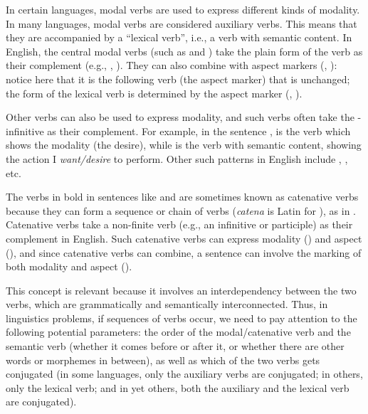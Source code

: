 \begin{refsection}
 In certain languages, modal verbs are used to express different kinds of modality. In many languages, modal verbs are considered auxiliary verbs. This means that they are accompanied by a ``lexical verb'', i.e., a verb with semantic content. In English, the central modal verbs (such as  and ) take the plain form of the verb as their complement (e.g., , ). They can also combine with aspect markers (, ): notice here that it is the following verb (the aspect marker) that is unchanged; the form of the lexical verb is determined by the aspect marker (, ).

 Other verbs can also be used to express modality, and such verbs often take the -infinitive as their complement. For example, in the sentence ,  is the verb which shows the modality (the desire), while  is the verb with semantic content, showing the action I \textit{want/desire} to perform. Other such patterns in English include , , etc.

The verbs in bold in sentences like  and  are sometimes known as catenative verbs because they can form a sequence or chain of verbs (\textit{catena} is Latin for ), as in . Catenative verbs take a non-finite verb (e.g., an infinitive or participle) as their complement in English. Such catenative verbs can express modality () and aspect (), and since catenative verbs can combine, a sentence can involve the marking of both modality and aspect ().

This concept is relevant because it involves an interdependency between the two verbs, which are grammatically and semantically interconnected. Thus, in linguistics problems, if sequences of verbs occur, we need to pay attention to the following potential parameters: the order of the modal/catenative verb and the semantic verb (whether it comes before or after it, or whether there are other words or morphemes in between), as well as which of the two verbs gets conjugated (in some languages, only the auxiliary verbs are conjugated; in others, only the lexical verb; and in yet others, both the auxiliary and the lexical verb are conjugated).


\end{refsection}

